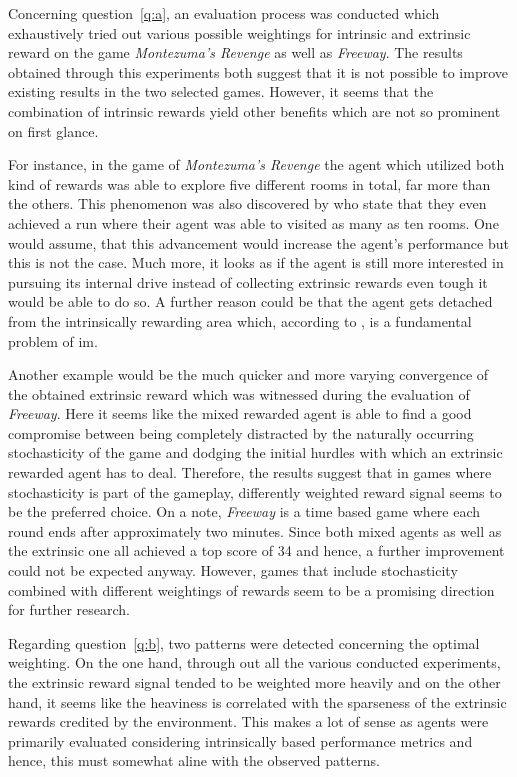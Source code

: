 \documentclass[draft,final]{vutinfth} %
\begin{document}
    Concerning question~\ref{q:a}, an evaluation process was conducted which exhaustively tried out various possible weightings for intrinsic and extrinsic reward on the game \textit{Montezuma's Revenge} as well as \textit{Freeway}.
    The results obtained through this experiments both suggest that it is not possible to improve existing results in the two selected games.
    However, it seems that the combination of intrinsic rewards yield other benefits which are not so prominent on first glance.

    For instance, in the game of \textit{Montezuma's Revenge} the agent which utilized both kind of rewards was able to explore five different rooms in total, far more than the others.
    This phenomenon was also discovered by \citeauthor{burda_large-scale_2018-1} who state that they even achieved a run where their agent was able to visited as many as ten rooms.
    One would assume, that this advancement would increase the agent's performance but this is not the case.
    Much more, it looks as if the agent is still more interested in pursuing its internal drive instead of collecting extrinsic rewards even tough it would be able to do so.
    A further reason could be that the agent gets detached from the intrinsically rewarding area which, according to \citet{ecoffet_go-explore_2019}, is a fundamental problem of \acrlong{im}.

    Another example would be the much quicker and more varying convergence of the obtained extrinsic reward which was witnessed during the evaluation of \textit{Freeway}.
    Here it seems like the mixed rewarded agent is able to find a good compromise between being completely distracted by the naturally occurring stochasticity of the game and dodging the initial hurdles with which an extrinsic rewarded agent has to deal.
    Therefore, the results suggest that in games where stochasticity is part of the gameplay, differently weighted reward signal seems to be the preferred choice.
    On a note, \textit{Freeway} is a time based game where each round ends after approximately two minutes.
    Since both mixed agents as well as the extrinsic one all achieved a top score of 34 and hence, a further improvement could not be expected anyway.
    However, games that include stochasticity combined with different weightings of rewards seem to be a promising direction for further research.

    Regarding question~\ref{q:b}, two patterns were detected concerning the optimal weighting.
    On the one hand, through out all the various conducted experiments, the extrinsic reward signal tended to be weighted more heavily and on the other hand, it seems like the heaviness is correlated with the sparseness of the extrinsic rewards credited by the environment.
    This makes a lot of sense as agents were primarily evaluated considering intrinsically based performance metrics and hence, this must somewhat aline with the observed patterns.
\end{document}
